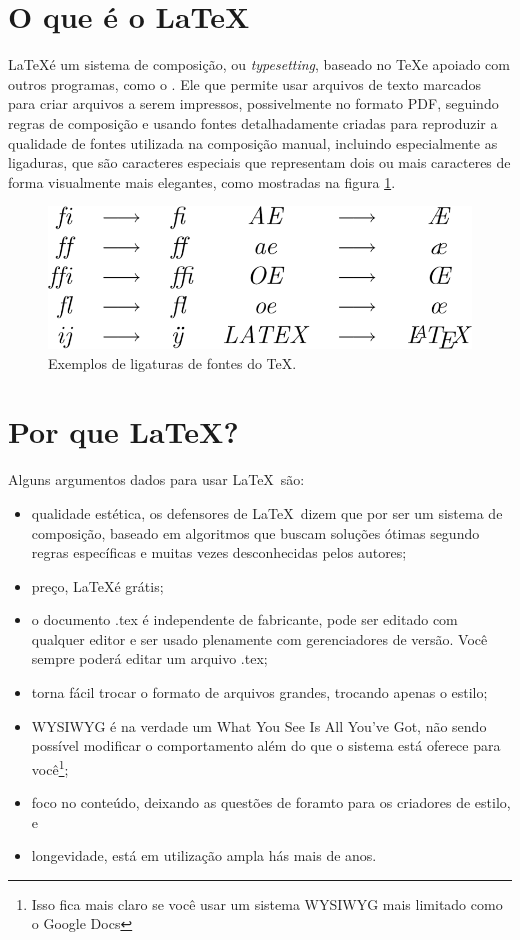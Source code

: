 \section{O que é o \LaTeX}

\LaTeX  é um sistema de composição, ou \textit{typesetting}, baseado no \TeX  e apoiado com outros programas, como o . Ele que permite usar arquivos de texto marcados para criar arquivos a serem impressos, possivelmente no formato PDF,  seguindo regras de composição  e usando fontes detalhadamente criadas para reproduzir a qualidade de fontes utilizada na composição manual, incluindo especialmente as ligaduras, que são caracteres especiais que representam dois ou mais caracteres de forma visualmente mais elegantes, como mostradas na figura \ref{fig:ligatureslatex}.

\begin{figure}[hbt]
    \centering
    \includegraphics[width=0.7\linewidth]{Images/799px-LigaturesLatex}
    \caption[Exemplos de ligaturas de fontes do \TeX]{Exemplos de ligaturas de fontes do \TeX.}
    \label{fig:ligatureslatex}
\end{figure}

\section{Por que \LaTeX?}

Alguns argumentos dados para usar \LaTeX\  são:
\begin{itemize}
    \item qualidade estética, os defensores de \LaTeX\ dizem que por ser um sistema de composição, baseado em algoritmos que buscam soluções ótimas segundo regras específicas e muitas vezes desconhecidas pelos autores;
    \item preço, \LaTeX  é grátis;
    \item o documento .tex é independente de fabricante, pode ser editado com qualquer editor e ser usado plenamente com gerenciadores de versão. Você sempre poderá editar um arquivo .tex;
    \item torna fácil trocar o formato de arquivos grandes, trocando apenas o estilo;
    \item WYSIWYG é na verdade um What You See Is All You've Got, não sendo possível modificar o comportamento além do que o sistema está oferece para você\footnote{Isso fica mais claro se você usar um sistema WYSIWYG mais limitado como o Google Docs};
    \item foco no conteúdo, deixando as questões de foramto para os criadores de estilo, e
    \item longevidade, está em utilização ampla hás mais de anos.
\end{itemize}


